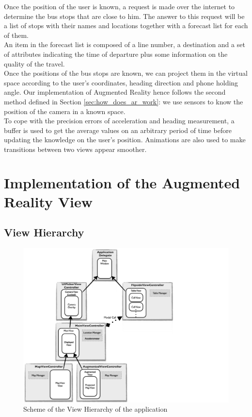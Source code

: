 Once the position of the user is known, a request is made over the internet to determine the bus stops that are close to him. The answer to this request will be a list of stops with their names and locations together with a forecast list for each of them.\\

An item in the forecast list is composed of a line number, a destination and a set of attributes indicating the time of departure plus some information on the quality of the travel.\\

Once the positions of the bus stops are known, we can project them in the virtual space according to the user's coordinates, heading direction and phone holding angle. Our implementation of Augmented Reality hence follows the second method defined in Section \ref{sec:how_does_ar_work}: we use sensors to know the position of the camera in a known space.\\

To cope with the precision errors of acceleration and heading measurement, a buffer is used to get the average values on an arbitrary period of time before updating the knowledge on the user's position. Animations are also used to make transitions between two views appear smoother.

\section{Implementation of the Augmented Reality View}
\label{sec:implementation_of_ar_view}

\subsection{View Hierarchy}

\begin{figure}[ht]
\center
\includegraphics[scale=0.5]{pics/client_view_hierarchy}
\caption{Scheme of the View Hierarchy of the application}
\label{fig:client_view_hierarchy}
\end{figure}

